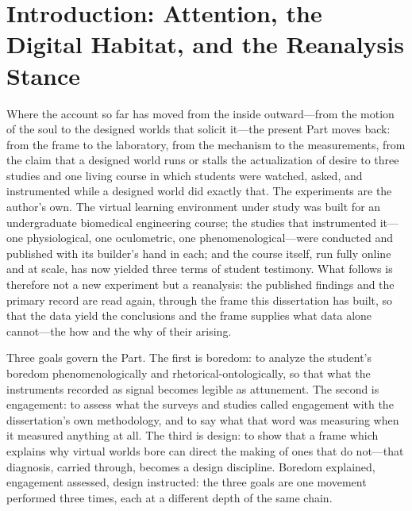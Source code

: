 
\section{Introduction: Attention, the Digital Habitat, and the Reanalysis Stance}

Where the account so far has moved from the inside outward---from the motion of the soul to the designed worlds that solicit it---the present Part moves back: from the frame to the laboratory, from the mechanism to the measurements, from the claim that a designed world runs or stalls the actualization of desire to three studies and one living course in which students were watched, asked, and instrumented while a designed world did exactly that. The experiments are the author's own. The virtual learning environment under study was built for an undergraduate biomedical engineering course; the studies that instrumented it---one physiological, one oculometric, one phenomenological---were conducted and published with its builder's hand in each; and the course itself, run fully online and at scale, has now yielded three terms of student testimony. What follows is therefore not a new experiment but a reanalysis: the published findings and the primary record are read again, through the frame this dissertation has built, so that the data yield the conclusions and the frame supplies what data alone cannot---the how and the why of their arising.

Three goals govern the Part. The first is boredom: to analyze the student's boredom phenomenologically and rhetorical-ontologically, so that what the instruments recorded as signal becomes legible as attunement. The second is engagement: to assess what the surveys and studies called engagement with the dissertation's own methodology, and to say what that word was measuring when it measured anything at all. The third is design: to show that a frame which explains why virtual worlds bore can direct the making of ones that do not---that diagnosis, carried through, becomes a design discipline. Boredom explained, engagement assessed, design instructed: the three goals are one movement performed three times, each at a different depth of the same chain.

